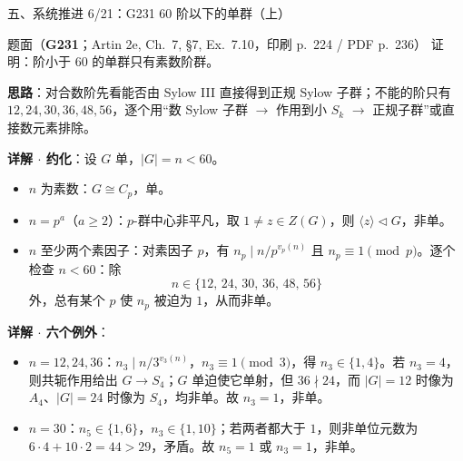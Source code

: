 \documentclass[aspectratio=169,10pt,fontset=none]{ctexbeamer}
\newcommand{\ex}[1]{\textcolor{accent}{\footnotesize\bfseries #1}}
\newcommand{\key}[1]{\textcolor{ink}{\bfseries #1}}
\begin{document}
\begin{frame}[t]{五、系统推进 6/21：G231 60 阶以下的单群（上）}
\label{ex:G231}
\scriptsize
\begin{block}{\footnotesize 题面（\ex{G231}；Artin 2e, Ch.~7, §7, Ex.~7.10，印刷 p.~224 / PDF p.~236）}
证明：阶小于 $60$ 的单群只有素数阶群。
\end{block}
\key{思路}：对合数阶先看能否由 Sylow III 直接得到正规 Sylow 子群；不能的阶只有 $12,24,30,36,48,56$，逐个用“数 Sylow 子群 $\to$ 作用到小 $S_k$ $\to$ 正规子群”或直接数元素排除。

\key{详解 $\cdot$ 约化}：设 $G$ 单，$|G|=n<60$。
\begin{itemize}
\item $n$ 为素数：$G\cong C_p$，单。
\item $n=p^a$（$a\ge2$）：$p$-群中心非平凡，取 $1\ne z\in Z(G)$，则 $\langle z\rangle\triangleleft G$，非单。
\item $n$ 至少两个素因子：对素因子 $p$，有 $n_p\mid n/p^{v_p(n)}$ 且 $n_p\equiv1\pmod p$。逐个检查 $n<60$：除
\[ n\in\{12,\,24,\,30,\,36,\,48,\,56\} \]
外，总有某个 $p$ 使 $n_p$ 被迫为 $1$，从而非单。
\end{itemize}

\key{详解 $\cdot$ 六个例外}：
\begin{itemize}
\item $n=12,24,36$：$n_3\mid n/3^{v_3(n)}$，$n_3\equiv1\pmod3$，得 $n_3\in\{1,4\}$。若 $n_3=4$，则共轭作用给出 $G\to S_4$；$G$ 单迫使它单射，但 $36\nmid24$，而 $|G|=12$ 时像为 $A_4$、$|G|=24$ 时像为 $S_4$，均非单。故 $n_3=1$，非单。
\item $n=30$：$n_5\in\{1,6\}$，$n_3\in\{1,10\}$；若两者都大于 $1$，则非单位元数为 $6\cdot4+10\cdot2=44>29$，矛盾。故 $n_5=1$ 或 $n_3=1$，非单。
\end{itemize}
\end{frame}
\end{document}
